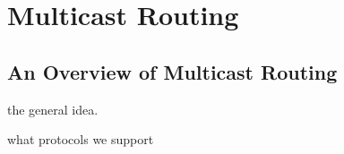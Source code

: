 \chapter{Multicast Routing}

\section{An Overview of Multicast Routing}

the general idea.

what protocols we support
